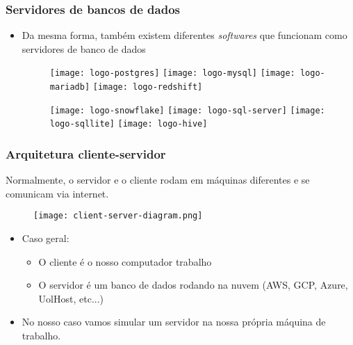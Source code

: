 \documentclass[t, 10pt, aspectratio=169, table, x11names]{beamer}
\begin{document}
	\begin{frame}
		\frametitle{Servidores de bancos de dados}
		\begin{itemize}
			\item[] Da mesma forma, também existem diferentes \textit{softwares} que funcionam como servidores de banco de dados
			\begin{figure}
				\vspace{6mm}
				\centering
				\texttt{[image: logo-postgres]}
				\hspace{5mm}
				\texttt{[image: logo-mysql]}
				\hspace{5mm}
				\texttt{[image: logo-mariadb]}
				\hspace{5mm}
				\texttt{[image: logo-redshift]}
			\end{figure}
			\begin{figure}
				\vspace{6mm}
				\centering
				\texttt{[image: logo-snowflake]}
				\hspace{5mm}
				\texttt{[image: logo-sql-server]}
				\hspace{5mm}
				\texttt{[image: logo-sqllite]}
				\hspace{5mm}
				\texttt{[image: logo-hive]}
			\end{figure}
		\end{itemize}
	\end{frame}

	\begin{frame}
		\frametitle{Arquitetura cliente-servidor}
		Normalmente, o servidor e o cliente rodam em máquinas diferentes e se comunicam via internet. 
		\begin{figure}[h]
			\texttt{[image: client-server-diagram.png]}
		\end{figure}
		\begin{itemize}
			\item[] Caso geral:
			\begin{itemize}
				\item O cliente é o nosso computador trabalho
				\item O servidor é um banco de dados rodando na nuvem (AWS, GCP, Azure, UolHost, etc...)
			\end{itemize}
			\vspace{2mm}
			\item[] No nosso caso vamos simular um servidor na nossa própria máquina de trabalho. 
		\end{itemize}
	\end{frame}
\end{document}
